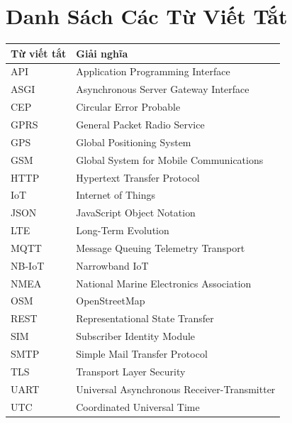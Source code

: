 \documentclass[13pt, a4paper]{report}
\begin{document}
\appendix
\chapter{Danh Sách Các Từ Viết Tắt}

\begin{table}[H]
\centering
\begin{tabularx}{\textwidth}{l X}
\toprule
\textbf{Từ viết tắt} & \textbf{Giải nghĩa} \\
\midrule
API    & Application Programming Interface \\
ASGI   & Asynchronous Server Gateway Interface \\
CEP    & Circular Error Probable \\
GPRS   & General Packet Radio Service \\
GPS    & Global Positioning System \\
GSM    & Global System for Mobile Communications \\
HTTP   & Hypertext Transfer Protocol \\
IoT    & Internet of Things \\
JSON   & JavaScript Object Notation \\
LTE    & Long-Term Evolution \\
MQTT   & Message Queuing Telemetry Transport \\
NB-IoT & Narrowband IoT \\
NMEA   & National Marine Electronics Association \\
OSM    & OpenStreetMap \\
REST   & Representational State Transfer \\
SIM    & Subscriber Identity Module \\
SMTP   & Simple Mail Transfer Protocol \\
TLS    & Transport Layer Security \\
UART   & Universal Asynchronous Receiver-Transmitter \\
UTC    & Coordinated Universal Time \\
\bottomrule
\end{tabularx}
\end{table}
\end{document}
